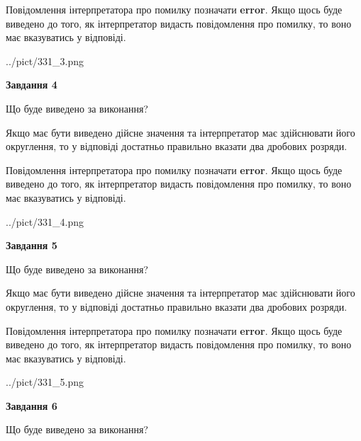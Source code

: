 \documentclass[12pt, ukrainian]{article}
\begin{document}
{\begin {Large}
Повідомлення інтерпретатора про помилку позначати \textbf{error}.
Якщо щось буде виведено до того, як інтерпретатор видасть повідомлення про помилку, 
то воно має вказуватись у відповіді. \par

\begin{center}
	{../pict/331_3.png}
\end{center}
\newpage

{\begin {center}\textbf{Завдання 4}\end {center}}\par
Що буде виведено за виконання? \par

Якщо має бути виведено дійсне значення та інтерпретатор має здійснювати його округлення, 
то у відповіді достатньо правильно вказати два дробових розряди.

Повідомлення інтерпретатора про помилку позначати \textbf{error}.
Якщо щось буде виведено до того, як інтерпретатор видасть повідомлення про помилку, 
то воно має вказуватись у відповіді. \par

\begin{center}
	{../pict/331_4.png}
\end{center}
\newpage

{\begin {center}\textbf{Завдання 5}\end {center}}\par
Що буде виведено за виконання? \par

Якщо має бути виведено дійсне значення та інтерпретатор має здійснювати його округлення, 
то у відповіді достатньо правильно вказати два дробових розряди.

Повідомлення інтерпретатора про помилку позначати \textbf{error}.
Якщо щось буде виведено до того, як інтерпретатор видасть повідомлення про помилку, 
то воно має вказуватись у відповіді. \par

\begin{center}
	{../pict/331_5.png}
\end{center}
\newpage

{\begin {center}\textbf{Завдання 6}\end {center}}\par
Що буде виведено за виконання? \par


\end{Large}}
\end{document}
